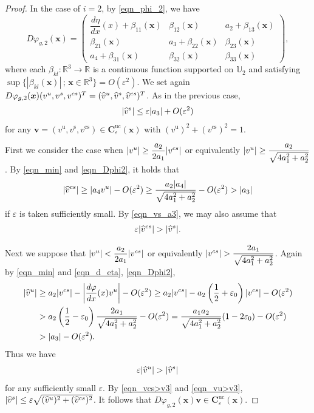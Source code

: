 \documentclass[10pt,a4paper]{amsart}
\def\bv{{\boldsymbol{v}}}
\def\bx{{\boldsymbol{x}}}
\begin{document}
\begin{proof}
In the case of $i=2$, by \eqref{eqn_phi_2}, we have 
\begin{equation}\label{eqn_Dphi2}
D\varphi_{g,2}(\bx)=\begin{pmatrix} \dfrac{d\eta}{dx}(x)+\beta_{11}(\bx)&\beta_{12}(\bx)&a_2+\beta_{13}(\bx)\\
\beta_{21}(\bx)&a_3+\beta_{22}(\bx)&\beta_{23}(\bx)\\
a_4+\beta_{31}(\bx)&\beta_{32}(\bx)&\beta_{33}(\bx)\end{pmatrix},
\end{equation}
where each $\beta_{kl}:\mathbb{R}^3\longrightarrow \mathbb{R}$ is a continuous function supported on $\mathbb{U}_2$ and satisfying  
$\sup\bigl\{|\beta_{kl}(\bx)|\, ;\, \bx \in \mathbb{R}^3\bigr\}=O(\varepsilon^2)$.
We set again $D\varphi_{g,2}(\bx)(v^{\rm u},v^{\rm s},v^{\rm cs})^T
=(\widehat{v}^{\rm u},\widehat{v}^{\rm s},\widehat{v}^{\rm cs})^T$.
As in the previous case, 
\begin{equation}\label{eqn_vs_a3}
|\widehat{v}^{\rm s}|\leq \varepsilon |a_3|+O(\varepsilon^2)
\end{equation}
for any $\bv=(v^{\mathrm{u}},v^{\mathrm{s}},v^{\mathrm{cs}})\in 
\boldsymbol{C}_{\varepsilon}^{\mathrm{uc}}(\boldsymbol{x})$ with 
$(v^{\mathrm{u}})^2+(v^{\mathrm{cs}})^2=1$.

First we consider the case when $|v^{\rm u}|\geq \dfrac{a_2}{2a_1}|v^{\rm cs}|$ or equivalently 
$|v^{\rm u}|\geq \dfrac{a_2}{\sqrt{4a_1^2+a_2^2}}$.
By \eqref{eqn_min} and \eqref{eqn_Dphi2}, it holds that 
\[
|\widehat{v}^{\rm cs}|\geq |a_4v^{\rm u}|-O(\varepsilon^2)\geq \dfrac{a_2|a_4|}{\sqrt{4a_1^2+a_2^2}}-O(\varepsilon^2)>|a_3|
\]
if $\varepsilon$ is taken sufficiently small.
By \eqref{eqn_vs_a3}, we may also assume that 
\begin{equation}\label{eqn_vcs>v3}
\varepsilon |\widehat{v}^{\rm cs}|>|\widehat{v}^{\rm s}|.
\end{equation}



Next we suppose that $|v^{\rm u}|<\dfrac{a_2}{2a_1}|v^{\rm cs}|$ or equivalently 
$|v^{\rm cs}|> \dfrac{2a_1}{\sqrt{4a_1^2+a_2^2}}$.
Again by \eqref{eqn_min} and \eqref{eqn_d_eta}, \eqref{eqn_Dphi2}, 
\begin{align*}
|\widehat{v}^{\rm u}|&\geq a_2|v^{\rm cs}|-\left|\frac{d\varphi}{dx}(x)v^{\rm u}\right|-O(\varepsilon^2)
\geq a_2|v^{\rm cs}|-a_2\left(\frac12+\varepsilon_0\right)|v^{\rm cs}|-O(\varepsilon^2)\\
&> a_2\left(\frac12-\varepsilon_0\right)\dfrac{2a_1}{\sqrt{4a_1^2+a_2^2}}-O(\varepsilon^2)
=\dfrac{a_1a_2}{\sqrt{4a_1^2+a_2^2}}(1-2\varepsilon_0)-O(\varepsilon^2)\\
&>|a_3|-O(\varepsilon^2).
\end{align*}
Thus we have 
\begin{equation}\label{eqn_vu>v3}
\varepsilon |\widehat{v}^{\rm u}|>|\widehat{v}^{\rm s}|
\end{equation}
for any sufficiently small $\varepsilon$. 
By \eqref{eqn_vcs>v3} and \eqref{eqn_vu>v3}, 
$|\widehat{v}^{\rm s}|\leq \varepsilon\sqrt{(\widehat{v}^{\rm u})^2+(\widehat{v}^{\rm cs})^2}$.
It follows that  
$D\varphi_{g,2}(\bx)\bv\in \boldsymbol{C}_{\varepsilon}^{\mathrm{uc}}(\boldsymbol{x})$.



\end{proof}
\end{document}
